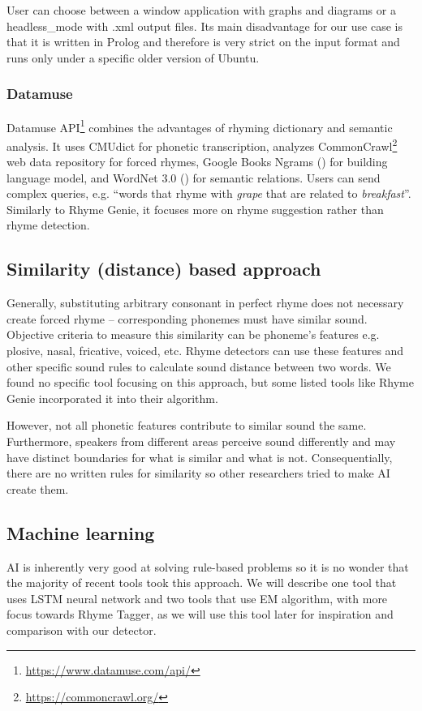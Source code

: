User can choose between a window application with graphs and diagrams or a \gls{headless_mode} with .xml output files. Its main disadvantage for our use case is that it is written in Prolog and therefore is very strict on the input format and runs only under a specific older version of Ubuntu. 

\subsubsection*{Datamuse}
Datamuse API\footnote{\url{https://www.datamuse.com/api/}} combines the advantages of rhyming dictionary and semantic analysis. It uses CMUdict for phonetic transcription, analyzes CommonCrawl\footnote{\url{https://commoncrawl.org/}} web data repository for forced rhymes, Google Books Ngrams (\cite{weiss2015google}) for building language model, and WordNet 3.0 (\cite{pearson2005encyclopedia}) for semantic relations. Users can send complex queries, e.g. ``words that rhyme with \textit{grape} that are related to \textit{breakfast}''. Similarly to Rhyme Genie, it focuses more on rhyme suggestion rather than rhyme detection.


\subsection{Similarity (distance) based approach}
Generally, substituting arbitrary consonant in perfect rhyme does not necessary create forced rhyme -- corresponding phonemes must have similar sound. Objective criteria to measure this similarity can be phoneme's features e.g. plosive, nasal, fricative, voiced, etc. Rhyme detectors can use these features and other specific sound rules to calculate sound distance between two words. We found no specific tool focusing on this approach, but some listed tools like Rhyme Genie incorporated it into their algorithm. 

However, not all phonetic features contribute to similar sound the same. Furthermore, speakers from different areas perceive sound differently and may have distinct boundaries for what is similar and what is not. Consequentially, there are no written rules for similarity so other researchers tried to make AI create them.

\subsection{Machine learning}
AI is inherently very good at solving rule-based problems so it is no wonder that the majority of recent tools took this approach. We will describe one tool that uses \gls{LSTM} neural network and two tools that use EM algorithm, with more focus towards Rhyme Tagger, as we will use this tool later for inspiration and comparison with our detector.

